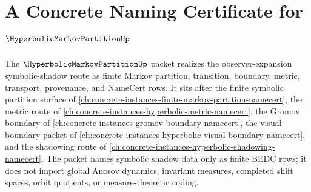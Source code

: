 \chapter{A Concrete Naming Certificate for $\HyperbolicMarkovPartitionUp$}
\label{ch:concrete-instances-hyperbolic-markov-partition-namecert}

The $\HyperbolicMarkovPartitionUp$ packet realizes the observer-expansion symbolic-shadow route as finite Markov partition, transition, boundary, metric, transport, provenance, and NameCert rows. It sits after the finite symbolic partition surface of \autoref{ch:concrete-instances-finite-markov-partition-namecert}, the metric route of \autoref{ch:concrete-instances-hyperbolic-metric-namecert}, the Gromov boundary of \autoref{ch:concrete-instances-gromov-boundary-namecert}, the visual-boundary packet of \autoref{ch:concrete-instances-hyperbolic-visual-boundary-namecert}, and the shadowing route of \autoref{ch:concrete-instances-hyperbolic-shadowing-namecert}. The packet names symbolic shadow data only as finite BEDC rows; it does not import global Anosov dynamics, invariant measures, completed shift spaces, orbit quotients, or measure-theoretic coding.

